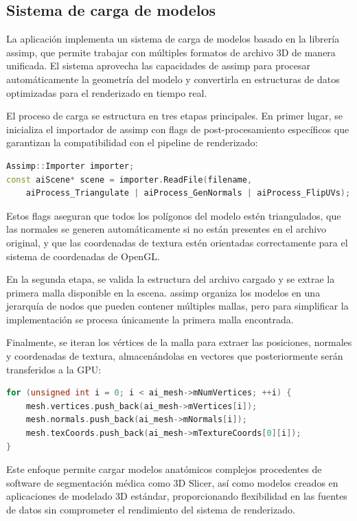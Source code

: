\subsection{Sistema de carga de modelos}

La aplicación implementa un sistema de carga de modelos basado en la librería \acrshort{assimp}, que permite trabajar con múltiples formatos de archivo 3D de manera unificada. El sistema aprovecha las capacidades de \acrshort{assimp} para procesar automáticamente la geometría del modelo y convertirla en estructuras de datos optimizadas para el renderizado en tiempo real.

El proceso de carga se estructura en tres etapas principales. En primer lugar, se inicializa el importador de \acrshort{assimp} con flags de post-procesamiento específicos que garantizan la compatibilidad con el pipeline de renderizado:

\begin{lstlisting}[language=C++]
Assimp::Importer importer;
const aiScene* scene = importer.ReadFile(filename, 
    aiProcess_Triangulate | aiProcess_GenNormals | aiProcess_FlipUVs);
\end{lstlisting}

Estos flags aseguran que todos los polígonos del modelo estén triangulados, que las normales se generen automáticamente si no están presentes en el archivo original, y que las coordenadas de textura estén orientadas correctamente para el sistema de coordenadas de OpenGL.

En la segunda etapa, se valida la estructura del archivo cargado y se extrae la primera malla disponible en la escena. \acrshort{assimp} organiza los modelos en una jerarquía de nodos que pueden contener múltiples mallas, pero para simplificar la implementación se procesa únicamente la primera malla encontrada.

Finalmente, se iteran los vértices de la malla para extraer las posiciones, normales y coordenadas de textura, almacenándolas en vectores que posteriormente serán transferidos a la GPU:

\begin{lstlisting}[language=C++]
for (unsigned int i = 0; i < ai_mesh->mNumVertices; ++i) {
    mesh.vertices.push_back(ai_mesh->mVertices[i]);
    mesh.normals.push_back(ai_mesh->mNormals[i]);
    mesh.texCoords.push_back(ai_mesh->mTextureCoords[0][i]);
}
\end{lstlisting}

Este enfoque permite cargar modelos anatómicos complejos procedentes de software de segmentación médica como 3D Slicer, así como modelos creados en aplicaciones de modelado 3D estándar, proporcionando flexibilidad en las fuentes de datos sin comprometer el rendimiento del sistema de renderizado.

